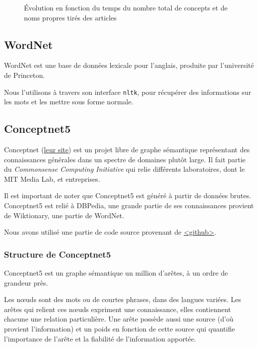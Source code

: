 \documentclass[a4paper, 12pt]{article}
\newcommand{\pyt}[1]{\texttt{#1}}%
\newcommand{\ang}[1]{\textit{#1}}%
\begin{document}
\begin{figure}[h]
 \centering
 \caption{\label{fig:conceptsnoms}Évolution en fonction du temps du nombre total de concepts et de noms propres tirés des articles}
\end{figure}



\subsection{WordNet}\label{Subsection:WordNet}

WordNet est une base de données lexicale pour l'anglais, produite par l'université de Princeton.

Nous l'utilisons à travers son interface \pyt{nltk}, pour récupérer des informations sur les mots et les mettre sous forme normale.


\subsection{Conceptnet5}\label{Subsection:Conceptnet5}

Conceptnet (\href{http://conceptnet5.media.mit.edu/}{leur site}) est un projet libre de graphe sémantique représentant des connaissances générales dans un spectre de domaines plutôt large. Il fait partie du \ang{Commonsense Computing Initiative} qui relie différents laboratoires, dont le MIT Media Lab, et entreprises.

Il est important de noter que Conceptnet5 est généré à partir de données brutes. Conceptnet5 est relié à DBPedia, une grande partie de ses connaissances provient de Wiktionary, une partie de WordNet.

Nous avons utilisé une partie de code source provenant de \href{https://github.com/commonsense/conceptnet5}{<github>}.


\subsubsection{Structure de Conceptnet5}

Conceptnet5 est un graphe sémantique un million d'arêtes, à un ordre de grandeur près.

Les n\oe{}uds sont des mots ou de courtes phrases, dans des langues variées. Les arêtes qui relient ces n\oe{}uds expriment une connaissance, elles contiennent chacune une relation particulière.
Une arête possède aussi une source (d'où provient l'information) et un poids en fonction de cette source qui quantifie l'importance de l'arête et la fiabilité de l'information apportée.
\end{document}
